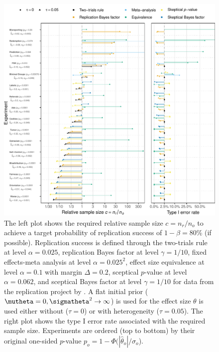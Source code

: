 \begin{figure}[!htb]
\begin{knitrout}
\color{fgcolor}
\includegraphics[width=\textwidth]{images/paper3/ssd-protzko-1}
\end{knitrout}
\caption{The left plot shows the required relative sample size $c = n_r/n_o$ to
  achieve a target probability of replication success of
  $1 - \beta = 80$\% (if possible). Replication success
  is defined through the two-trials rule at level $\alpha = 0.025$,
  replication Bayes factor at level $\gamma = 1/10$, fixed
  effects-meta analysis at level $\alpha = 0.025^{2}$,
  effect size equivalence at level $\alpha = 0.1$ with margin
  $\Delta = 0.2$, sceptical $p$-value at level
  $\alpha = 0.062$, and sceptical Bayes factor at level
  $\gamma = 1/10$ for data from the replication project by
  \citet{Protzko2020}. A flat initial prior
  ($\mutheta = 0, \sigmatheta^{2} \to \infty$) is used for the effect size
  $\theta$ is used either without ($\tau = 0$) or with heterogeneity
  ($\tau = 0.05$). The right plot shows the type I error
  rate associated with the required sample size. Experiments are ordered (top to
  bottom) by their original one-sided $p$-value
  $p_{o} = 1 - \Phi(|\hat{\theta}_{o}|/\sigma_{o}$).}
\label{fig3:ssd-all}
\end{figure}

